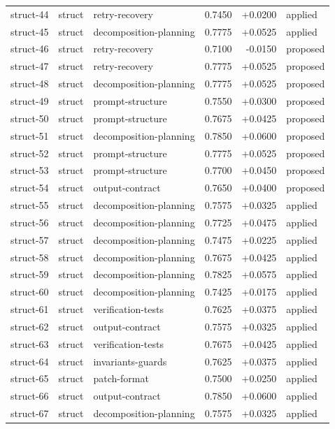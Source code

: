 \begin{center}
\begin{longtable}{llp{5.2cm}rrl}
struct-44 & struct & retry-recovery & 0.7450 & +0.0200 & applied \\
struct-45 & struct & decomposition-planning & 0.7775 & +0.0525 & applied \\
struct-46 & struct & retry-recovery & 0.7100 & -0.0150 & proposed \\
struct-47 & struct & retry-recovery & 0.7775 & +0.0525 & proposed \\
struct-48 & struct & decomposition-planning & 0.7775 & +0.0525 & proposed \\
struct-49 & struct & prompt-structure & 0.7550 & +0.0300 & proposed \\
struct-50 & struct & prompt-structure & 0.7675 & +0.0425 & proposed \\
struct-51 & struct & decomposition-planning & 0.7850 & +0.0600 & proposed \\
struct-52 & struct & prompt-structure & 0.7775 & +0.0525 & proposed \\
struct-53 & struct & prompt-structure & 0.7700 & +0.0450 & proposed \\
struct-54 & struct & output-contract & 0.7650 & +0.0400 & proposed \\
struct-55 & struct & decomposition-planning & 0.7575 & +0.0325 & applied \\
struct-56 & struct & decomposition-planning & 0.7725 & +0.0475 & applied \\
struct-57 & struct & decomposition-planning & 0.7475 & +0.0225 & applied \\
struct-58 & struct & decomposition-planning & 0.7675 & +0.0425 & applied \\
struct-59 & struct & decomposition-planning & 0.7825 & +0.0575 & applied \\
struct-60 & struct & decomposition-planning & 0.7425 & +0.0175 & applied \\
struct-61 & struct & verification-tests & 0.7625 & +0.0375 & applied \\
struct-62 & struct & output-contract & 0.7575 & +0.0325 & applied \\
struct-63 & struct & verification-tests & 0.7675 & +0.0425 & applied \\
struct-64 & struct & invariants-guards & 0.7625 & +0.0375 & applied \\
struct-65 & struct & patch-format & 0.7500 & +0.0250 & applied \\
struct-66 & struct & output-contract & 0.7850 & +0.0600 & applied \\
struct-67 & struct & decomposition-planning & 0.7575 & +0.0325 & applied \\

\end{longtable}
\end{center}
